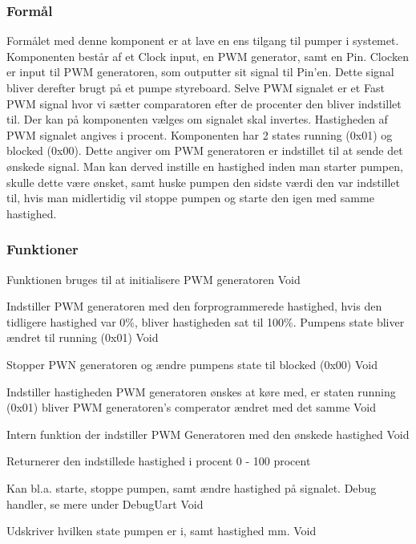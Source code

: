 \subsubsection{Formål}
Formålet med denne komponent er at lave en ens tilgang 
til pumper i systemet. Komponenten består af et Clock 
input, en PWM generator, samt en Pin. Clocken er input 
til PWM generatoren, som outputter sit signal til Pin'en. 
Dette signal bliver derefter brugt på et pumpe 
styreboard. Selve PWM signalet er et Fast PWM signal 
hvor vi sætter comparatoren efter de procenter den 
bliver indstillet til. Der kan på komponenten vælges om 
signalet skal invertes. Hastigheden af PWM signalet 
angives i procent. Komponenten har 2 states running (0x01) 
og blocked (0x00). Dette angiver om PWM generatoren er 
indstillet til at sende det ønskede signal. 
Man kan derved instille en hastighed inden man starter 
pumpen, skulle dette være ønsket, samt huske pumpen den 
sidste værdi den var indstillet til, hvis man midlertidig 
vil stoppe pumpen og starte den igen med samme hastighed.

\subsubsection{Funktioner}

{Funktionen bruges til at initialisere PWM generatoren}
{Void}
{}

{Indstiller PWM generatoren med den forprogrammerede hastighed, hvis den tidligere hastighed var 0\%, bliver hastigheden sat til 100\%. Pumpens state bliver ændret til running (0x01)}
{Void}
{}

{Stopper PWN generatoren og ændre pumpens state til blocked (0x00)}
{Void}
{}

{Indstiller hastigheden PWM generatoren ønskes at køre med, er staten running (0x01) bliver PWM generatoren's comperator ændret med det samme}
{Void}
{
}

{Intern funktion der indstiller PWM Generatoren med den ønskede hastighed}
{Void}
{}

{Returnerer den indstillede hastighed i procent}
{0 - 100 procent}
{}

{Kan bl.a. starte, stoppe pumpen, samt ændre hastighed på signalet. Debug handler, se mere under DebugUart}
{Void}
{
}

{Udskriver hvilken state pumpen er i, samt hastighed mm.}
{Void}
{}